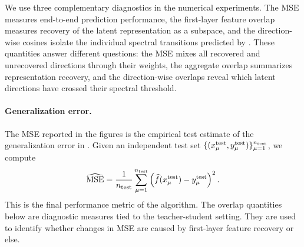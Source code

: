 \documentclass[]{article}
\numberwithin{equation}{section}
\theoremstyle{definition}
\begin{document}


We use three complementary diagnostics in the numerical experiments. The MSE measures end-to-end prediction performance, the first-layer feature overlap measures recovery of the latent representation as a subspace, and the direction-wise cosines isolate the individual spectral transitions predicted by . These quantities answer different questions: the MSE mixes all recovered and unrecovered directions through their weights, the aggregate overlap summarizes representation recovery, and the direction-wise overlaps reveal which latent directions have crossed their spectral threshold.

\paragraph{Generalization error.}
The MSE reported in the figures is the empirical test estimate of the generalization error in . Given an independent test set $\{(x_\mu^{\rm test},y_\mu^{\rm test})\}_{\mu=1}^{n_{\rm test}}$, we compute
\begin{equation}
    \widehat{\mathrm{MSE}}
    =
    \frac{1}{n_{\rm test}}
    \sum_{\mu=1}^{n_{\rm test}}
    \left(\widehat f(x_\mu^{\rm test})-y_\mu^{\rm test}\right)^2 .
\end{equation}
This is the final performance metric of the algorithm. The overlap quantities below are diagnostic measures tied to the teacher-student setting. They are used to identify whether changes in MSE are caused by first-layer feature recovery or else. 
\end{document}
